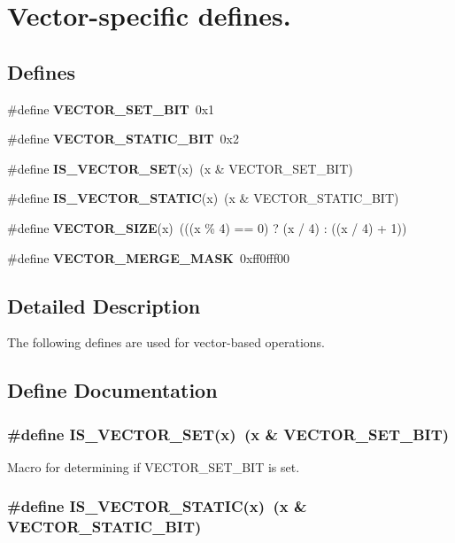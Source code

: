 \section{Vector-specific defines.}
\label{group__vector__defs}
\subsection*{Defines}
\begin{CompactItemize}
\item 
\#define {\bf VECTOR\_\-SET\_\-BIT}\ 0x1
\item 
\#define {\bf VECTOR\_\-STATIC\_\-BIT}\ 0x2
\item 
\#define {\bf IS\_\-VECTOR\_\-SET}(x)\ (x \& VECTOR\_\-SET\_\-BIT)
\item 
\#define {\bf IS\_\-VECTOR\_\-STATIC}(x)\ (x \& VECTOR\_\-STATIC\_\-BIT)
\item 
\#define {\bf VECTOR\_\-SIZE}(x)\ (((x \% 4) == 0) ? (x / 4) : ((x / 4) + 1))
\item 
\#define {\bf VECTOR\_\-MERGE\_\-MASK}\ 0xff0fff00
\end{CompactItemize}


\subsection{Detailed Description}
The following defines are used for vector-based operations. 

\subsection{Define Documentation}
\subsubsection{\setlength{\rightskip}{0pt plus 5cm}\#define IS\_\-VECTOR\_\-SET(x)\ (x \& VECTOR\_\-SET\_\-BIT)}\label{group__vector__defs_a2}


Macro for determining if VECTOR\_\-SET\_\-BIT is set. 
\subsubsection{\setlength{\rightskip}{0pt plus 5cm}\#define IS\_\-VECTOR\_\-STATIC(x)\ (x \& VECTOR\_\-STATIC\_\-BIT)}\label{group__vector__defs_a3}


